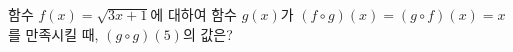 함수 $f(x)=\sqrt{3x+1}$에 대하여 함수 $g(x)$가 $(f\circ g)(x)=(g\circ f)(x)=x$를 만족시킬 때, $(g\circ g)(5)$의 값은?
